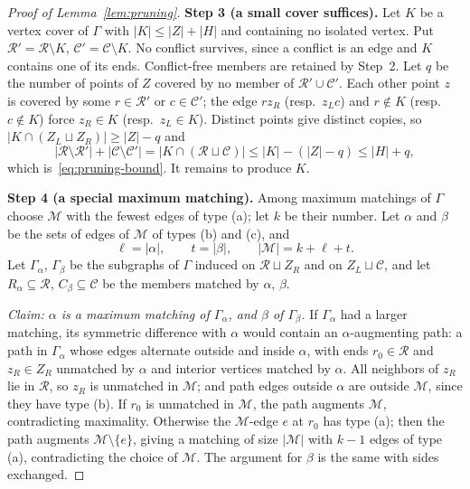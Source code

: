 \documentclass[11pt]{article}
\theoremstyle{remark}
\newcommand{\abs}[1]{\lvert #1\rvert}
\newcommand{\step}[1]{\par\smallskip\noindent\textbf{Step #1.}}
\newcommand{\cR}{\mathcal R}
\newcommand{\cC}{\mathcal C}
\newcommand{\cM}{\mathcal M}
\begin{document}
\begin{proof}[Proof of Lemma~\ref{lem:pruning}]
\step{3 (a small cover suffices)} Let $K$ be a vertex cover of $\Gamma$ with
$\abs K\le\abs Z+\abs H$ and containing no isolated vertex. Put
$\cR'=\cR\setminus K$, $\cC'=\cC\setminus K$. No conflict survives, since a
conflict is an edge and $K$ contains one of its ends. Conflict-free members are
retained by Step~2. Let $q$ be the number of points of $Z$ covered by no member
of $\cR'\cup\cC'$. Each other point $z$ is covered by some $r\in\cR'$ or
$c\in\cC'$; the edge $rz_R$ (resp.\ $z_Lc$) and $r\notin K$ (resp.\
$c\notin K$) force $z_R\in K$ (resp.\ $z_L\in K$). Distinct points give
distinct copies, so $\abs{K\cap(Z_L\sqcup Z_R)}\ge\abs Z-q$ and
\begin{equation}\label{eq:cover-charge}
 \abs{\cR\setminus\cR'}+\abs{\cC\setminus\cC'}=\abs{K\cap(\cR\sqcup\cC)}
 \leq\abs K-(\abs Z-q)\leq\abs H+q,
\end{equation}
which is~\eqref{eq:pruning-bound}. It remains to produce $K$.

\step{4 (a special maximum matching)} Among maximum matchings of $\Gamma$
choose $\cM$ with the fewest edges of type (a); let $k$ be their number. Let
$\alpha$ and $\beta$ be the sets of edges of $\cM$ of types (b) and (c), and
\[
 \ell=\abs\alpha,\qquad t=\abs\beta,\qquad\abs{\cM}=k+\ell+t.
\]
Let $\Gamma_\alpha$, $\Gamma_\beta$ be the subgraphs of $\Gamma$ induced on
$\cR\sqcup Z_R$ and on $Z_L\sqcup\cC$, and let $R_\alpha\subseteq\cR$,
$C_\beta\subseteq\cC$ be the members matched by $\alpha$, $\beta$.

\emph{Claim: $\alpha$ is a maximum matching of $\Gamma_\alpha$, and $\beta$ of
$\Gamma_\beta$.} If $\Gamma_\alpha$ had a larger matching, its symmetric
difference with $\alpha$ would contain an $\alpha$-augmenting path: a path in
$\Gamma_\alpha$ whose edges alternate outside and inside $\alpha$, with ends
$r_0\in\cR$ and $z_R\in Z_R$ unmatched by $\alpha$ and interior vertices
matched by $\alpha$. All neighbors of $z_R$ lie in $\cR$, so $z_R$ is unmatched
in $\cM$; and path edges outside $\alpha$ are outside $\cM$, since they have
type (b). If $r_0$ is unmatched in $\cM$, the path augments $\cM$,
contradicting maximality. Otherwise the $\cM$-edge $e$ at $r_0$ has type (a);
then the path augments $\cM\setminus\{e\}$, giving a matching of size
$\abs{\cM}$ with $k-1$ edges of type (a), contradicting the choice of $\cM$.
The argument for $\beta$ is the same with sides exchanged.


\end{proof}
\end{document}
